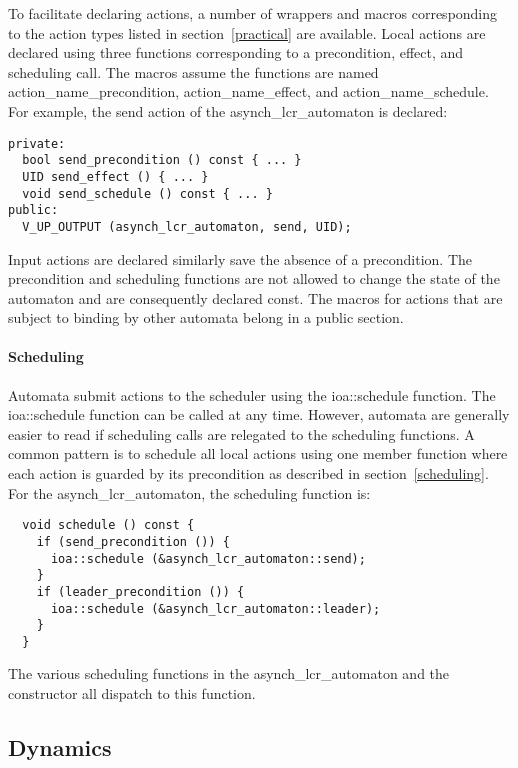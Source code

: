 To facilitate declaring actions, a number of wrappers and macros corresponding to the action types listed in section~\ref{practical} are available.
Local actions are declared using three functions corresponding to a precondition, effect, and scheduling call.
The macros assume the functions are named action\_name\_precondition, action\_name\_effect, and action\_name\_schedule.
For example, the send action of the asynch\_lcr\_automaton is declared:
\ifjournal
\begin{lstlisting}
private:
  bool send_precondition () const { ... }
  UID send_effect () { ... }
  void send_schedule () const { ... }
public:
  V_UP_OUTPUT (asynch_lcr_automaton, send, UID);
\end{lstlisting}
\fi
Input actions are declared similarly save the absence of a precondition.
The precondition and scheduling functions are not allowed to change the state of the automaton and are consequently declared const.
The macros for actions that are subject to binding by other automata belong in a public section.

\paragraph*{Scheduling}
Automata submit actions to the scheduler using the ioa::schedule function.
The ioa::schedule function can be called at any time.
However, automata are generally easier to read if scheduling calls are relegated to the scheduling functions.
A common pattern is to schedule all local actions using one member function where each action is guarded by its precondition as described in section~\ref{scheduling}.
For the asynch\_lcr\_automaton, the scheduling function is:
\ifjournal
\begin{lstlisting}
  void schedule () const {
    if (send_precondition ()) {
      ioa::schedule (&asynch_lcr_automaton::send);
    }
    if (leader_precondition ()) {
      ioa::schedule (&asynch_lcr_automaton::leader);
    }
  }
\end{lstlisting}
\fi
The various scheduling functions in the asynch\_lcr\_automaton and the constructor all dispatch to this function.

\subsection{Dynamics}

